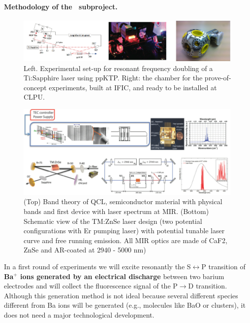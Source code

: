 \paragraph{Methodology of the \BATA\ subproject.}

\begin{figure}
\begin{center}
\includegraphics[width=0.99\textwidth]{img/blueLaser.png}
\caption{\small Left. Experimental set-up for resonant frequency doubling of a 
Ti:Sapphire laser using ppKTP. Right: the chamber for the prove-of-concept experiments, built at IFIC, and ready to be installed at CLPU.}
\label{fig:chamber}
\end{center}
\end{figure}

\begin{figure}[h!]
\begin{center}
\includegraphics[width=0.99\textwidth]{img/MIR.png}
\end{center}
\caption{\label{Fig:MIR} (Top) Band theory of QCL, semiconductor material with physical bands and first device with laser spectrum at MIR. (Bottom) Schematic view of the TM:ZnSe laser design (two potential configurations with Er pumping laser) with potential tunable laser curve and free running emission. All MIR optics are made of CaF2, ZnSe and AR-coated at 2940 - 5000 nm) }
\end{figure}

In a first round of experiments we will excite resonantly the S$\leftrightarrow$P transition of {\bf Ba$^+$ ions generated by an electrical discharge} between two barium electrodes and will collect the fluorescence signal of the P$\rightarrow$D transition. Although this generation method is not ideal because several different species different from Ba ions will be generated (e.g., molecules like BaO or clusters), it does not need a major technological development. 

